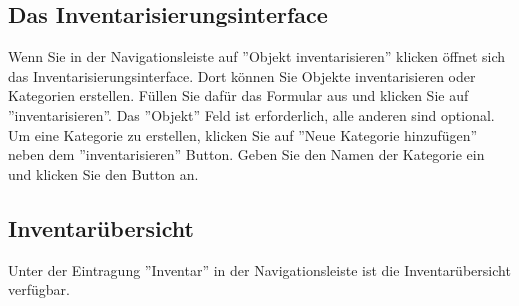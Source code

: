 \documentclass{article}
\begin{document}
\subsection{Das Inventarisierungsinterface}
Wenn Sie in der Navigationsleiste auf ''Objekt inventarisieren'' klicken öffnet sich das Inventarisierungsinterface. Dort können Sie Objekte inventarisieren oder Kategorien erstellen. Füllen Sie dafür das Formular aus und klicken Sie auf ''inventarisieren''. Das ''Objekt'' Feld ist erforderlich, alle anderen sind optional. \newline
Um eine Kategorie zu erstellen, klicken Sie auf ''Neue Kategorie hinzufügen'' neben dem ''inventarisieren'' Button. Geben Sie den Namen der Kategorie ein und klicken Sie den Button an.
\subsection{Inventarübersicht}
Unter der Eintragung ''Inventar'' in der Navigationsleiste ist die Inventarübersicht verfügbar.
\end{document}
